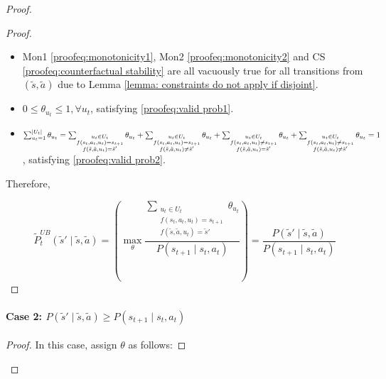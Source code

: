 \begin{proof}
\begin{proof}
\begin{itemize}
        \item Mon1 \eqref{proofeq:monotonicity1}, Mon2 \eqref{proofeq:monotonicity2} and CS \eqref{proofeq:counterfactual stability} are all vacuously true for all transitions from $(\tilde{s}, \tilde{a})$ due to Lemma \ref{lemma: constraints do not apply if disjoint}.

        \item $0 \leq \theta_{u_t} \leq 1, \forall u_t$, satisfying \eqref{proofeq:valid prob1}.
        
        \item $\sum_{u_t = 1}^{|U_t|} \theta_{u_t} = \sum_{\substack{u_t \in U_t \\f(s_t, a_t, u_t) = s_{t+1} \\ f(\tilde{s}, \tilde{a}, u_t) = \tilde{s}'}} \theta_{u_t} + \sum_{\substack{u_t \in U_t \\f(s_t, a_t, u_t) = s_{t+1} \\ f(\tilde{s}, \tilde{a}, u_t) \neq \tilde{s}'}} \theta_{u_t} + \sum_{\substack{u_t \in U_t \\f(s_t, a_t, u_t) \neq s_{t+1} \\ f(\tilde{s}, \tilde{a}, u_t) = \tilde{s}'}} \theta_{u_t} \\+ \sum_{\substack{u_t \in U_t \\f(s_t, a_t, u_t) \neq s_{t+1} \\ f(\tilde{s}, \tilde{a}, u_t) \neq \tilde{s}'}} \theta_{u_t} = 1$, satisfying \eqref{proofeq:valid prob2}.
    \end{itemize}

    Therefore,

    \[\tilde{P}_{t}^{UB}(\tilde{s}' \mid \tilde{s}, \tilde{a}) = \left( \max_\theta \frac{ \sum_{\substack{u_t \in U_t \\f(s_t, a_t, u_t) = s_{t+1} \\ f(\tilde{s}, \tilde{a}, u_t) = \tilde{s}'}} \theta_{u_t} }{P(s_{t+1} \mid s_t, a_t)} \right) = \frac{P(\tilde{s}' \mid \tilde{s}, \tilde{a})}{P(s_{t+1} \mid s_t, a_t)}\]
\end{proof}

\paragraph{Case 2: $P(\tilde{s}' \mid \tilde{s}, \tilde{a}) \geq P(s_{t+1} \mid s_t, a_t)$}
\noindent
\begin{proof}
In this case, assign $\theta$ as follows:


\end{proof}
\end{proof}

